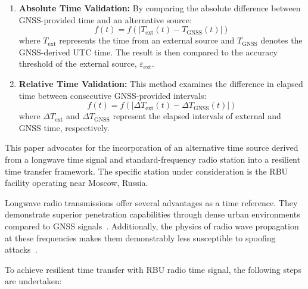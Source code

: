 \documentclass[12pt, a4paper]{extarticle}
\begin{document}
\begin{enumerate}
    \item \textbf{Absolute Time Validation:}
        By comparing the absolute difference between GNSS-provided time and an alternative source:
        \[
            f(t) = f(|T_{\text{ext}}(t) - T_{\text{GNSS}}(t)|)
        \]
        where $T_{\text{ext}}$ represents the time from an external source and
        $T_{\text{GNSS}}$ denotes the GNSS-derived UTC time.
        The result is then compared to the accuracy threshold of the external source, $\varepsilon_{\text{ext}}$.

    \item \textbf{Relative Time Validation:}
        This method examines the difference in elapsed time between consecutive GNSS-provided intervals:
        \[
            f(t) = f(|\Delta T_{\text{ext}}(t) - \Delta T_{\text{GNSS}} (t) |)
        \]
        where $\Delta T_{\text{ext}}$ and $\Delta T_{\text{GNSS}}$ represent the
        elapsed intervals of external and GNSS time, respectively.
\end{enumerate}

This paper advocates for the incorporation of an alternative time source
derived from a longwave time signal and standard-frequency radio station into a
resilient time transfer framework. The specific station under consideration is
the RBU facility operating near Moscow, Russia.

Longwave radio transmissions offer several advantages as a time reference. They
demonstrate superior penetration capabilities through dense urban environments
compared to GNSS signals~\cite{itu2007ground}. Additionally, the physics of radio wave
propagation at these frequencies makes them demonstrably less susceptible to
spoofing attacks~\cite{classen2013jamming}.

To achieve resilient time transfer with RBU radio time signal, the following steps are undertaken:
\end{document}
